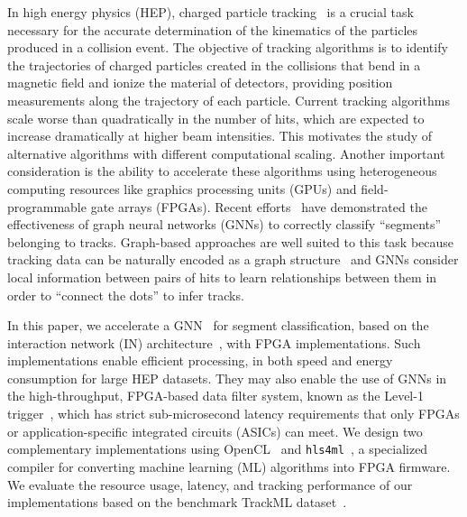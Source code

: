 \documentclass{article}
\newcommand{\hlsfml}{\texttt{hls4ml}\xspace}
\begin{document}
In high energy physics (HEP), charged particle tracking~\cite{Amrouche:2019wmx,Strandlie:2010zz} is a crucial task necessary for the accurate determination of the kinematics of the particles produced in a collision event.
The objective of tracking algorithms is to identify the trajectories of charged particles created in the collisions that bend in a magnetic field and ionize the material of detectors, providing position measurements along the trajectory of each particle.
Current tracking algorithms~\cite{Chatrchyan:2014fea,Aaboud:2017all,combkalman1,combkalman2,combkalman3,kalman} scale worse than quadratically in the number of hits, which are expected to increase dramatically at higher beam intensities. %
This motivates the study of alternative algorithms with different computational scaling. 
Another important consideration is the ability to accelerate these algorithms using heterogeneous computing resources like graphics processing units (GPUs) and field-programmable gate arrays (FPGAs).
Recent efforts~\cite{Farrell:2018cjr,Ju:2020xty} have demonstrated the effectiveness of graph neural networks (GNNs) to correctly classify ``segments'' belonging to tracks.
Graph-based approaches are well suited to this task because tracking data can be naturally encoded as a graph structure~\cite{Shlomi:2020gdn} and GNNs consider local information between pairs of hits to learn relationships between them in order to ``connect the dots'' to infer tracks.

In this paper, we accelerate a GNN~\cite{Ju:2020xty} for segment classification, based on the interaction network (IN) architecture~\cite{Battaglia:2016jem,battaglia2018relational}, with FPGA implementations. 
Such implementations enable efficient processing, in both speed and energy consumption for large HEP datasets.
They may also enable the use of GNNs in the high-throughput, FPGA-based data filter system, known as the Level-1 trigger~\cite{ATLASL1T,ATLASP2L1T,CMSL1T,CMSP2L1T}, which has strict sub-microsecond latency requirements that only FPGAs or application-specific integrated circuits (ASICs) can meet.
We design two complementary implementations using OpenCL~\cite{OpenCL} and \hlsfml~\cite{Duarte:2018ite}, a specialized compiler for converting machine learning (ML) algorithms into FPGA firmware.
We evaluate the resource usage, latency, and tracking performance of our implementations based on the benchmark TrackML dataset~\cite{Amrouche:2019wmx}.
\end{document}
